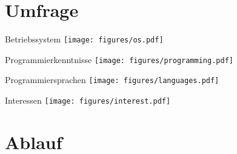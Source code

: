 \section{Umfrage}


\begin{frame}{Betriebssystem}
  \centering
  \texttt{[image: figures/os.pdf]}
\end{frame}

\begin{frame}{Programmierkenntnisse}
  \centering
  \texttt{[image: figures/programming.pdf]}
\end{frame}

\begin{frame}{Programmiersprachen}
  \centering
  \texttt{[image: figures/languages.pdf]}
\end{frame}

\begin{frame}{Interessen}
  \centering
  \texttt{[image: figures/interest.pdf]}
\end{frame}

\section{Ablauf}

